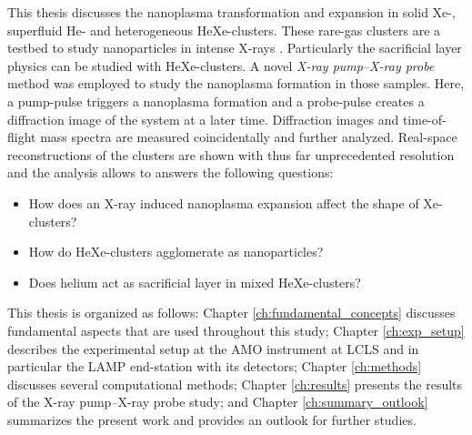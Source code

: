 %
This thesis discusses the nanoplasma transformation and expansion in solid Xe-, superfluid He- and heterogeneous HeXe-clusters. These rare-gas clusters are a testbed to study nanoparticles in intense X-rays \cite{Fennel-2010-RMP}. Particularly the sacrificial layer physics can be studied with HeXe-clusters. A novel \textit{X-ray pump--X-ray probe} method was employed to study the nanoplasma formation in those samples. Here, a pump-pulse triggers a nanoplasma formation and a probe-pulse creates a diffraction image of the system at a later time. Diffraction images and time-of-flight mass spectra are measured coincidentally and further analyzed. Real-space reconstructions of the clusters are shown with thus far unprecedented resolution and the analysis allows to answers the following questions:
\begin{itemize}
	\item How does an X-ray induced nanoplasma expansion affect the shape of Xe-clusters?
	\item How do HeXe-clusters agglomerate as nanoparticles?
	\item Does helium act as sacrificial layer in mixed HeXe-clusters?
\end{itemize}
%
This thesis is organized as follows: Chapter \ref{ch:fundamental_concepts} discusses fundamental aspects that are used throughout this study; Chapter \ref{ch:exp_setup} describes the experimental setup at the AMO instrument at LCLS and in particular the LAMP end-station with its detectors; Chapter \ref{ch:methods} discusses several computational methods; Chapter \ref{ch:results} presents the results of the X-ray pump--X-ray probe study; and Chapter \ref{ch:summary_outlook} summarizes the present work and provides an outlook for further studies.
%
%
%